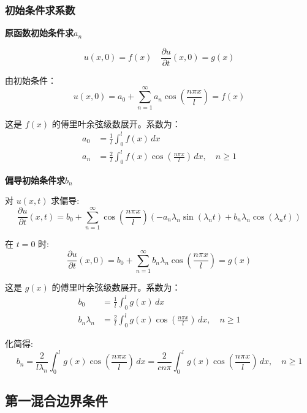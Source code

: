 \documentclass[12pt,a4paper]{article}
\numberwithin{subsection}{section}   %
\numberwithin{subsubsection}{subsection}
\theoremstyle{plain}
\theoremstyle{definition}
\theoremstyle{remark}
\theoremstyle{remark}
\begin{document}
	\subsubsection{初始条件求系数}
	\noindent
	\textbf{原函数初始条件求$a_n$}
	
	\begin{equation}
		u(x, 0) = f(x) \quad \frac{\partial u}{\partial t}(x, 0) = g(x)
	\end{equation}
	
	由初始条件：
	\begin{equation}
		u(x, 0) = a_0 + \sum_{n=1}^{\infty} a_n \cos\left(\frac{n\pi x}{l}\right) = f(x)
	\end{equation}
	
	这是 $f(x)$ 的傅里叶余弦级数展开。系数为：
	\begin{align}
		a_0 &= \frac{1}{l} \int_0^l f(x) \, dx \\
		a_n &= \frac{2}{l} \int_0^l f(x) \cos\left(\frac{n\pi x}{l}\right) \, dx, \quad n \ge 1
	\end{align}
	
	\noindent
	\textbf{偏导初始条件求$b_n$}
	
	对 $u(x,t)$ 求偏导:
	\begin{equation}
		\frac{\partial u}{\partial t}(x, t) = b_0 + \sum_{n=1}^{\infty} \cos\left(\frac{n\pi x}{l}\right) \left( -a_n \lambda_n \sin(\lambda_n t) + b_n \lambda_n \cos(\lambda_n t) \right)
	\end{equation}
	
	在 \(t = 0\) 时:
	\begin{equation}
		\frac{\partial u}{\partial t}(x, 0) = b_0 + \sum_{n=1}^{\infty} b_n \lambda_n \cos\left(\frac{n\pi x}{l}\right) = g(x)
	\end{equation}
	
	这是 $g(x)$ 的傅里叶余弦级数展开。系数为：
	\begin{align}
		b_0 &= \frac{1}{l} \int_0^l g(x) \, dx \\
		b_n \lambda_n &= \frac{2}{l} \int_0^l g(x) \cos\left(\frac{n\pi x}{l}\right) \, dx, \quad n \ge 1
	\end{align}
	
	化简得:
	\begin{equation}
		b_n = \frac{2}{l \lambda_n} \int_0^l g(x) \cos\left(\frac{n\pi x}{l}\right) \, dx = \frac{2}{cn\pi} \int_0^l g(x) \cos\left(\frac{n\pi x}{l}\right) \, dx, \quad n \ge 1
	\end{equation}
	
	
	\subsection{第一混合边界条件}
	
\end{document}

